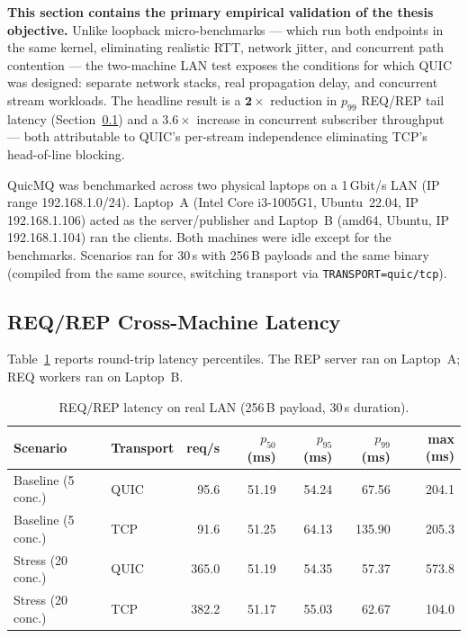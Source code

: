 \documentclass[12pt, a4paper, oneside]{report}
\begin{document}
\textbf{This section contains the primary empirical validation of the thesis objective.}
Unlike loopback micro-benchmarks — which run both endpoints in the same kernel, eliminating realistic RTT, network jitter, and concurrent path contention — the two-machine LAN test exposes the conditions for which QUIC was designed: separate network stacks, real propagation delay, and concurrent stream workloads.
The headline result is a $\mathbf{2{\times}}$ reduction in $p_{99}$ REQ/REP tail latency (Section~\ref{sec:phys-reqrep}) and a $\mathbf{3.6{\times}}$ increase in concurrent subscriber throughput — both attributable to QUIC's per-stream independence eliminating TCP's head-of-line blocking.

QuicMQ was benchmarked across two physical laptops on a 1\,Gbit/s LAN (IP range 192.168.1.0/24). Laptop~A (Intel Core i3-1005G1, Ubuntu~22.04, IP 192.168.1.106) acted as the server/publisher and Laptop~B (amd64, Ubuntu, IP 192.168.1.104) ran the clients. Both machines were idle except for the benchmarks. Scenarios ran for 30\,s with 256\,B payloads and the same binary (compiled from the same source, switching transport via \texttt{TRANSPORT=quic/tcp}).

\subsection{REQ/REP Cross-Machine Latency}
\label{sec:phys-reqrep}

Table~\ref{tab:phys-reqrep} reports round-trip latency percentiles. The REP server ran on Laptop~A; REQ workers ran on Laptop~B.

\begin{table}[H]
  \centering
  \caption{REQ/REP latency on real LAN (256\,B payload, 30\,s duration).}
  \label{tab:phys-reqrep}
  \begin{tabular}{llrrrrr}
    \toprule
    \textbf{Scenario} & \textbf{Transport} & \textbf{req/s} & \textbf{$p_{50}$ (ms)} & \textbf{$p_{95}$ (ms)} & \textbf{$p_{99}$ (ms)} & \textbf{max (ms)} \\
    \midrule
    Baseline (5 conc.)  & QUIC & 95.6  & 51.19 & 54.24 &  67.56 & 204.1 \\
    Baseline (5 conc.)  & TCP  & 91.6  & 51.25 & 64.13 & 135.90 & 205.3 \\
    Stress (20 conc.)   & QUIC & 365.0 & 51.19 & 54.35 &  57.37 & 573.8 \\
    Stress (20 conc.)   & TCP  & 382.2 & 51.17 & 55.03 &  62.67 & 104.0 \\
    \bottomrule
  \end{tabular}
\end{table}
\end{document}

